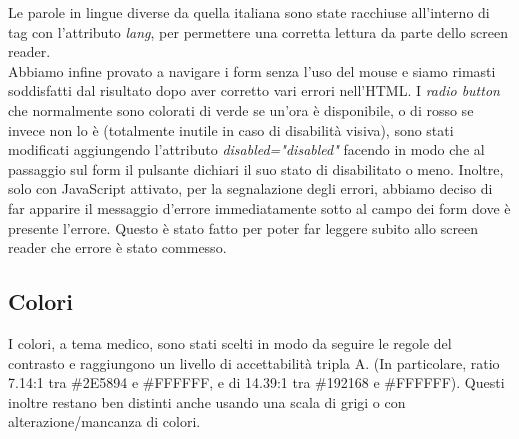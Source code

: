 Le parole in lingue diverse da quella italiana sono state racchiuse all'interno di tag con l'attributo \textit{lang}, per permettere una corretta lettura da parte dello screen reader.\\


Abbiamo infine provato a navigare i form senza l’uso del mouse e siamo rimasti soddisfatti dal risultato dopo aver corretto vari errori nell’HTML.
I \textit{radio button} che normalmente sono colorati di verde se un’ora è disponibile, o di rosso se invece non lo è (totalmente inutile in caso di disabilità visiva), sono stati modificati aggiungendo l'attributo \textit{disabled="disabled"} facendo in modo che al passaggio sul form il pulsante dichiari il suo stato di disabilitato o meno.
Inoltre, solo con JavaScript attivato, per la segnalazione degli errori, abbiamo deciso di far apparire il messaggio d'errore immediatamente sotto al campo dei form dove è presente l'errore. Questo è stato fatto per poter far leggere subito allo screen reader che errore è stato commesso. 

\pagebreak

\subsection{Colori}

I colori, a tema medico, sono stati scelti in modo da seguire le regole del contrasto e raggiungono un livello di accettabilità tripla A. (In particolare, ratio 7.14:1 tra \#2E5894 e \#FFFFFF, e di 14.39:1 tra \#192168 e \#FFFFFF).
Questi inoltre restano ben distinti anche usando una scala di grigi o con alterazione/mancanza di colori.\\

\begin{center}
\end{center}

